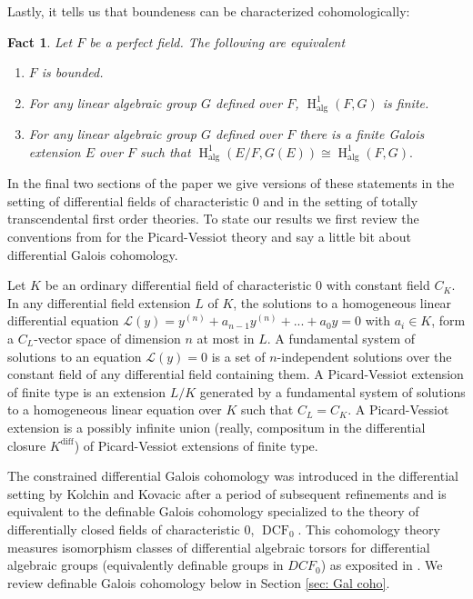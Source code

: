 \documentclass{amsart}
\newtheorem{fact}[theorem]{Fact}
\theoremstyle{definition}
\theoremstyle{remark}
\numberwithin{equation}{section}
\def \HH {\operatorname{H}}
\def \diff {\operatorname{diff}}
\def \alg {\operatorname{alg}}
\def \DCF {\operatorname{DCF}}
\begin{document}
Lastly, it tells us that boundeness can be characterized cohomologically: 

\begin{fact}\label{fact: alg bdd}\cite{Serre1979}
    Let $F$ be a perfect field. The following are equivalent
    
    \begin{enumerate}
        \item $F$ is bounded. 
        \item For any linear algebraic group $G$ defined over $F$, $\HH^1_{\alg}(F,G)$ is finite. 
        \item For any linear algebraic group $G$ defined over $F$ there is a finite Galois extension $E$ over $F$ such that $\HH^1_{\alg}(E/F,G(E))  \cong  \HH^1_{\alg}(F,G).$
    \end{enumerate}
\end{fact} 

In the final two sections of the paper we give versions of these statements in the setting of differential fields of characteristic $0$ and in the setting of  totally transcendental first order theories. To state our results we first review the conventions from \cite{meretzky2026galoistheoryautomorphismgroups} for the Picard-Vessiot theory and say a little bit about differential Galois cohomology.

Let $K$ be an ordinary differential field of characteristic $0$ with constant field $C_K$. In any differential field extension $L$ of $K$, the solutions to a homogeneous linear differential equation $\mathcal{L}(y) = y^{(n)} + a_{n-1}y^{(n)} + ... +a_0y = 0$ with $a_i \in K$, form a $C_L$-vector space of dimension $n$ at most in $L$. A fundamental system of solutions to an equation $\mathcal{L}(y) = 0$ is a set of $n$-independent solutions over the constant field of any differential field containing them. A Picard-Vessiot extension of finite type is an extension $L/K$ generated by a fundamental system of solutions to a homogeneous linear equation over $K$ such that $C_L=C_K$.  A Picard-Vessiot extension is a possibly infinite union (really, compositum in the differential closure $K^{\diff}$) of Picard-Vessiot extensions of finite type.

The constrained differential Galois cohomology was introduced in the differential setting by Kolchin and Kovacic after a period of subsequent refinements \cite{kolchin1985differential} and is equivalent to the definable Galois cohomology specialized to the theory of differentially closed fields of characteristic $0$, $\DCF_0$. This cohomology theory measures isomorphism classes of differential algebraic torsors for differential algebraic groups (equivalently definable groups in $DCF_0$) as exposited in \cite{kolchin1985differential}. We review definable Galois cohomology below in Section \ref{sec: Gal coho}.
\end{document}
